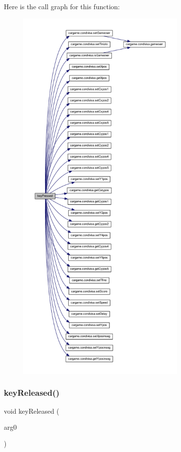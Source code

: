 Here is the call graph for this function\+:
\nopagebreak
\begin{figure}[H]
\begin{center}
\leavevmode
\includegraphics[height=550pt]{classcargame_1_1giocoseparato_aa12eb1084be2c4d9b03d5f248f00900d_cgraph}
\end{center}
\end{figure}
\mbox{\label{classcargame_1_1giocoseparato_a9debbd2095df906c88381a23fbc0e5e0}} 
\subsubsection{\texorpdfstring{key\+Released()}{keyReleased()}}
{\footnotesize\ttfamily void key\+Released (\begin{DoxyParamCaption}\item[{Key\+Event}]{arg0 }\end{DoxyParamCaption})}



